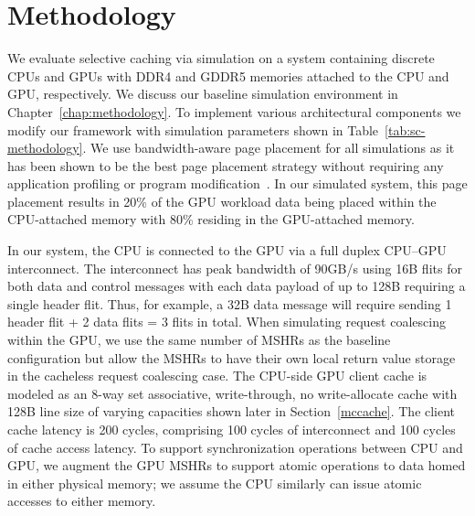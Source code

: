 \vspace{-.05in}
\section{Methodology}
\label{methodology}

We evaluate selective caching via simulation on a system containing discrete
CPUs and GPUs with DDR4 and GDDR5 memories attached to the CPU and GPU,
respectively.  We discuss our baseline simulation environment in
Chapter~\ref{chap:methodology}.  To implement various architectural components
we modify our framework with simulation parameters shown in
Table~\ref{tab:sc-methodology}.  We use bandwidth-aware page placement for all
simulations as it has been shown to be the best page placement strategy without
requiring any application profiling or program modification~\cite{Agarwal2015}.
In our simulated system, this page placement results in 20\% of the GPU workload
data being placed within the CPU-attached memory with 80\% residing in the
GPU-attached memory.  

In our system, the CPU is connected to the GPU via a full duplex CPU--GPU
interconnect. The interconnect has peak bandwidth of 90GB/s using 16B flits for
both data and control messages with each data payload of up to 128B requiring a
single header flit.  Thus, for example, a 32B data message will require sending
1 header flit + 2 data flits = 3 flits in total.
When simulating request coalescing within the GPU, we use the same number of
MSHRs as the baseline configuration but allow the MSHRs to have their own local
return value storage in the cacheless request coalescing case.  The CPU-side GPU
client cache is modeled as an 8-way set associative, write-through, no
write-allocate cache with 128B line size of varying capacities shown later in
Section~\ref{mccache}. The client cache latency is 200 cycles, comprising 100
cycles of interconnect and 100 cycles of cache access latency.  To support
synchronization operations between CPU and GPU, we augment the GPU MSHRs to
support atomic operations to data homed in either physical memory; we assume the
CPU similarly can issue atomic accesses to either memory.

